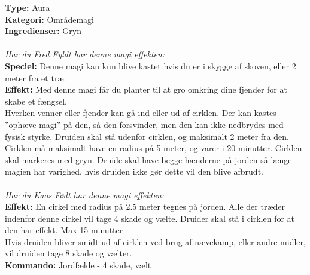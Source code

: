 \begin{nly*}
\textbf{Type:} Aura \\
\textbf{Kategori:} Områdemagi\\
\textbf{Ingredienser:} Gryn\\
\\
\emph{\textit{Har du Fred Fyldt har denne magi effekten:}}\\
\textbf{Speciel:} Denne magi kan kun blive kastet hvis du er i skygge af skoven, eller 2 meter fra et træ.\\
\textbf{Effekt:} Med denne magi får du planter til at gro omkring dine fjender for at skabe et fængsel.\\ 
Hverken venner eller fjender kan gå ind eller ud af cirklen. Der kan kastes ”ophæve magi” på den, så den forsvinder, men den kan ikke nedbrydes med fysisk styrke. Druiden skal stå udenfor cirklen, og maksimalt 2 meter fra den. Cirklen må maksimalt have en radius på 5 meter, og varer i 20 minutter. Cirklen skal
markeres med gryn. Druide skal have begge hænderne på jorden så længe magien har varighed, hvis druiden ikke gør dette vil den blive afbrudt.\\
\\
\emph{\textit{Har du Kaos Født har denne magi effekten:}}\\
\textbf{Effekt:} En cirkel med radius på 2.5 meter tegnes på jorden. Alle der træder indenfor denne cirkel vil tage 4 skade og vælte. Druider skal stå i cirklen for at den har effekt. Max 15 minutter\\
Hvis druiden bliver smidt ud af cirklen ved brug af nævekamp, eller andre midler, vil druiden tage 8 skade og vælter.\\
\textbf{Kommando:} Jordfælde - 4 skade, vælt
\end{nly*}

